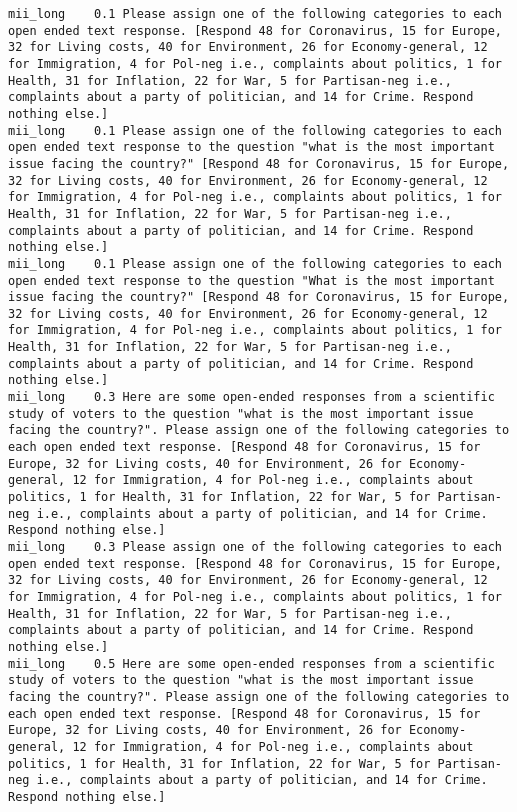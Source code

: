 \begin{lstlisting}[label=lst:promptvariants]
mii_long	0.1	Please assign one of the following categories to each open ended text response. [Respond 48 for Coronavirus, 15 for Europe, 32 for Living costs, 40 for Environment, 26 for Economy-general, 12 for Immigration, 4 for Pol-neg i.e., complaints about politics, 1 for Health, 31 for Inflation, 22 for War, 5 for Partisan-neg i.e., complaints about a party of politician, and 14 for Crime. Respond nothing else.]
mii_long	0.1	Please assign one of the following categories to each open ended text response to the question "what is the most important issue facing the country?" [Respond 48 for Coronavirus, 15 for Europe, 32 for Living costs, 40 for Environment, 26 for Economy-general, 12 for Immigration, 4 for Pol-neg i.e., complaints about politics, 1 for Health, 31 for Inflation, 22 for War, 5 for Partisan-neg i.e., complaints about a party of politician, and 14 for Crime. Respond nothing else.]
mii_long	0.1	Please assign one of the following categories to each open ended text response to the question "What is the most important issue facing the country?" [Respond 48 for Coronavirus, 15 for Europe, 32 for Living costs, 40 for Environment, 26 for Economy-general, 12 for Immigration, 4 for Pol-neg i.e., complaints about politics, 1 for Health, 31 for Inflation, 22 for War, 5 for Partisan-neg i.e., complaints about a party of politician, and 14 for Crime. Respond nothing else.]
mii_long	0.3	Here are some open-ended responses from a scientific study of voters to the question "what is the most important issue facing the country?". Please assign one of the following categories to each open ended text response. [Respond 48 for Coronavirus, 15 for Europe, 32 for Living costs, 40 for Environment, 26 for Economy-general, 12 for Immigration, 4 for Pol-neg i.e., complaints about politics, 1 for Health, 31 for Inflation, 22 for War, 5 for Partisan-neg i.e., complaints about a party of politician, and 14 for Crime. Respond nothing else.]
mii_long	0.3	Please assign one of the following categories to each open ended text response. [Respond 48 for Coronavirus, 15 for Europe, 32 for Living costs, 40 for Environment, 26 for Economy-general, 12 for Immigration, 4 for Pol-neg i.e., complaints about politics, 1 for Health, 31 for Inflation, 22 for War, 5 for Partisan-neg i.e., complaints about a party of politician, and 14 for Crime. Respond nothing else.]
mii_long	0.5	Here are some open-ended responses from a scientific study of voters to the question "what is the most important issue facing the country?". Please assign one of the following categories to each open ended text response. [Respond 48 for Coronavirus, 15 for Europe, 32 for Living costs, 40 for Environment, 26 for Economy-general, 12 for Immigration, 4 for Pol-neg i.e., complaints about politics, 1 for Health, 31 for Inflation, 22 for War, 5 for Partisan-neg i.e., complaints about a party of politician, and 14 for Crime. Respond nothing else.]

\end{lstlisting}
